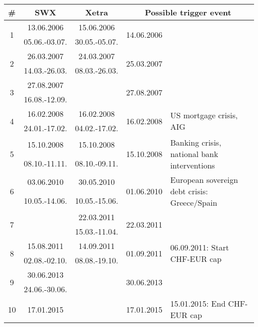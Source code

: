 \documentclass[11pt,twoside,a4paper]{article}
\numberwithin{equation}{section}
\numberwithin{figure}{section}
\numberwithin{table}{section}
\begin{document}
\begin{table}[!ht]
\small
\begin{tabular}{c|c|c|c|l}
\# & SWX & Xetra & \multicolumn{2}{|c}{Possible trigger event}\\
\hline
\multirow{2}{*}{1} & 13.06.2006 		& 15.06.2006     & \multirow{2}{*}{14.06.2006} & \multirow{2}{0.33\linewidth}{}\\
							 & 05.06.-03.07.	& 30.05.-05.07. & &\\
\hline
\multirow{2}{*}{2} & 26.03.2007 		& 24.03.2007     & \multirow{2}{*}{25.03.2007} & \multirow{2}{0.33\linewidth}{}\\
							 & 14.03.-26.03.	& 08.03.-26.03. & &\\
\hline
\multirow{2}{*}{3} & 27.08.2007 		&      & \multirow{2}{*}{27.08.2007} & \multirow{2}{0.33\linewidth}{}\\
							 & 16.08.-12.09.	& & &\\
\hline
\multirow{2}{*}{4} & 16.02.2008 		& 16.02.2008     & \multirow{2}{*}{16.02.2008} & \multirow{2}{0.33\linewidth}{US mortgage crisis, AIG}\\
							 & 24.01.-17.02.	& 04.02.-17.02. & &\\
\hline
\multirow{2}{*}{5} & 15.10.2008 		& 15.10.2008     & \multirow{2}{*}{15.10.2008} & \multirow{2}{0.33\linewidth}{Banking crisis, national bank interventions}\\
							 & 08.10.-11.11.	& 08.10.-09.11. & &\\
\hline
\multirow{2}{*}{6} & 03.06.2010 		& 30.05.2010     & \multirow{2}{*}{01.06.2010} & \multirow{2}{0.33\linewidth}{European sovereign debt crisis: Greece/Spain}\\
							 & 10.05.-14.06.	& 10.05.-15.06. & &\\
\hline
\multirow{2}{*}{7} & & 22.03.2011     & \multirow{2}{*}{22.03.2011} & \multirow{2}{0.33\linewidth}{}\\
							 & & 15.03.-11.04. & &\\
\hline
\multirow{2}{*}{8} & 15.08.2011 		& 14.09.2011  & \multirow{2}{*}{01.09.2011} & \multirow{2}{0.33\linewidth}{06.09.2011:  Start CHF-EUR cap}\\
							 & 02.08.-02.10.	& 08.08.-19.10. & &\\
\hline
\multirow{2}{*}{9} & 30.06.2013 		& & \multirow{2}{*}{30.06.2013} & \multirow{2}{0.33\linewidth}{}\\
							 & 24.06.-30.06.	& & &\\
\hline
\multirow{2}{*}{10} & 17.01.2015 		& & \multirow{2}{*}{17.01.2015} & \multirow{2}{0.33\linewidth}{15.01.2015: End CHF-EUR cap}\\

\end{tabular}
\end{table}
\end{document}
